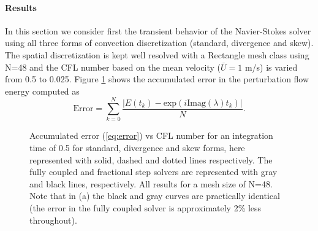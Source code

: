 \paragraph{Results}
In this section we consider first the transient behavior of the Navier-Stokes solver using all three forms of convection discretization (standard, divergence and skew). The spatial discretization is kept well resolved with a Rectangle mesh class using N=48 and the CFL number based on the mean velocity ($\overline{U}=1$ m/s) is varied from 0.5 to 0.025. Figure \ref{fig:OS_init_cfl}  shows the accumulated error in the perturbation flow energy computed as
\begin{equation}
 \text{Error} = \sum_{k=0}^N \frac{|E(t_k)-\text{exp}(i \text{Imag}(\lambda) t_k)|}{N}.
 \label{eq:error}
\end{equation}
\begin{figure}
 \centering
 \caption{Accumulated error (\ref{eq:error}) vs CFL number for an integration time of 0.5 for standard, divergence and skew forms, here represented with solid, dashed and dotted lines respectively. The fully coupled and fractional step solvers are represented with gray and black lines, respectively. All results for a mesh size of N=48. Note that in (a) the black and gray curves are practically identical (the error in the fully coupled solver is approximately 2\% less throughout). }
\label{fig:OS_init_cfl}
\end{figure}
